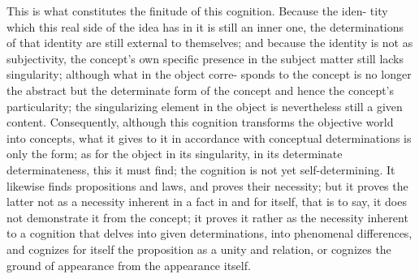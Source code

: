 This is what constitutes the finitude of this cognition. Because the iden-
tity which this real side of the idea has in it is still an inner one, the
determinations of that identity are still external to themselves; and because
the identity is not as subjectivity, the concept’s own specific presence in
the subject matter still lacks singularity; although what in the object corre-
sponds to the concept is no longer the abstract but the determinate form of
the concept and hence the concept’s particularity; the singularizing element
in the object is nevertheless still a given content. Consequently, although
this cognition transforms the objective world into concepts, what it gives
to it in accordance with conceptual determinations is only the form; as for
the object in its singularity, in its determinate determinateness, this it must
find; the cognition is not yet self-determining. It likewise finds propositions
and laws, and proves their necessity; but it proves the latter not as a necessity
inherent in a fact in and for itself, that is to say, it does not demonstrate it
from the concept; it proves it rather as the necessity inherent to a cognition
that delves into given determinations, into phenomenal differences, and
cognizes for itself the proposition as a unity and relation, or cognizes the
ground of appearance from the appearance itself.


